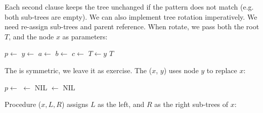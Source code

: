 \documentclass[b5paper]{article}
\begin{document}
\be
{}
\ee

Each second clause keeps the tree unchanged if the pattern does not match (e.g. both sub-trees are empty). We can also implement tree rotation imperatively. We need re-assign sub-trees and parent reference. When rotate, we pass both the root $T$, and the node $x$ as parameters:

\begin{algorithmic}[1]
  \State $p \gets$ 
  \State $y \gets$  
  \State $a \gets$ 
  \State $b \gets$ 
  \State $c \gets$ 
  \State {}  
  \State {} 
  \State {} 
    
    \State $T \gets y$
  \EndIf
  \State \Return $T$
\EndFunction
\end{algorithmic}

The  is symmetric, we leave it as exercise. The ($x$, $y$) uses node $y$ to replace $x$:

\begin{algorithmic}[1]
  \State $p \gets$ 
   
            $\gets$ NIL
    \EndIf
    \State {}
  \Else
    \State {}
  \EndIf
  \State {} $\gets$ NIL
\EndFunction
\end{algorithmic}

Procedure ($x, L, R$) assigns $L$ as the left, and $R$ as the right sub-trees of $x$:
\end{document}
